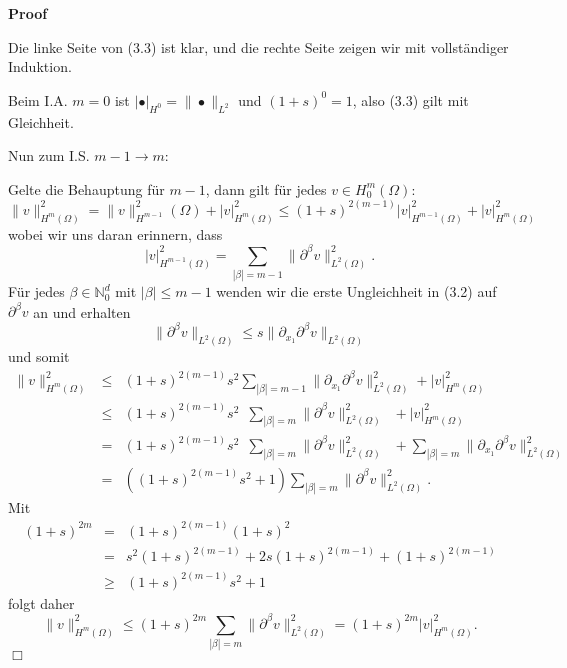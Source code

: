 \documentclass{book}
\newenvironment{proof}{\noindent\textbf{Proof\ }}{\hspace*{\fill}$\Box$\medskip}
\begin{document}
\begin{proof}
  \
  
  Die linke Seite von (3.3) ist klar, und die rechte Seite zeigen wir mit
  vollst{\"a}ndiger Induktion.
  
  Beim I.A. $m = 0$ ist $| \bullet |_{H^0} = \| \bullet \|_{L^2}$ und $(1 +
  s)^0 = 1$, also (3.3) gilt mit Gleichheit.
  
  Nun zum I.S. $m - 1 \rightarrow m$:
  
  Gelte die Behauptung f{\"u}r $m - 1$, dann gilt f{\"u}r jedes $v \in H^m_0
  (\Omega)$: \
  \[ \| v \|^2_{H^m (\Omega)} = \| v \|^2_{H^{m - 1}} (\Omega) + | v |^2_{H^m
     (\Omega)} \leqslant (1 + s)^{2 (m - 1)} | v |^2_{H^{m - 1} (\Omega)} + |
     v |^2_{H^m (\Omega)} \]
  wobei wir uns daran erinnern, dass
  \[ | v |^2_{H^{m - 1} (\Omega)} = \sum_{| \beta | = m - 1} \|
     \partial^{\beta} v \|^2_{L^2 (\Omega)} . \]
  {\hspace{1.7em}}F{\"u}r jedes $\beta \in \mathbb{N}_0^d$ mit $| \beta |
  \leqslant m - 1$ wenden wir die erste Ungleichheit in (3.2) auf
  $\partial^{\beta} v$ an und erhalten
  \[ \| \partial^{\beta} v \|_{L^2 (\Omega)} \leqslant s \| \partial_{x_1}
     \partial^{\beta} v \|_{L^2 (\Omega)} \]
  und somit
  \begin{eqnarray*}
    \| v \|^2_{H^m (\Omega)} & \leqslant & (1 + s)^{2 (m - 1)} s^2 \sum_{|
    \beta | = m - 1} \| \partial_{x_1} \partial^{\beta} v \|^2_{L^2 (\Omega)}
    + | v |^2_{H^m (\Omega)}\\
    & \leqslant & (1 + s)^{2 (m - 1)} s^2 \enspace \sum_{| \beta | = m} \|
    \partial^{\beta} v \|^2_{L^2 (\Omega)} \enspace + | v |^2_{H^m (\Omega)}\\
    & = & (1 + s)^{2 (m - 1)} s^2 \enspace \sum_{| \beta | = m} \|
    \partial^{\beta} v \|^2_{L^2 (\Omega)} \enspace + \sum_{| \beta | = m} \|
    \partial_{x_1} \partial^{\beta} v \|^2_{L^2 (\Omega)}\\
    & = & ((1 + s)^{2 (m - 1)} s^2 + 1) \sum_{| \beta | = m} \|
    \partial^{\beta} v \|^2_{L^2 (\Omega)} .
  \end{eqnarray*}
  {\hspace{1.7em}}Mit
  \begin{eqnarray*}
    (1 + s)^{2 m} & = & (1 + s)^{2 (m - 1)} (1 + s)^2\\
    & = & s^2 (1 + s)^{2 (m - 1)} + 2 s (1 + s)^{2 (m - 1)} + (1 + s)^{2 (m -
    1)}\\
    & \geqslant & (1 + s)^{2 (m - 1)} s^2 + 1
  \end{eqnarray*}
  folgt daher
  \[ \| v \|^2_{H^m (\Omega)} \leqslant (1 + s)^{2 m} \sum_{| \beta | = m} \|
     \partial^{\beta} v \|^2_{L^2 (\Omega)} = (1 + s)^{2 m} | v |^2_{H^m
     (\Omega)} . \]
\end{proof}
\end{document}

